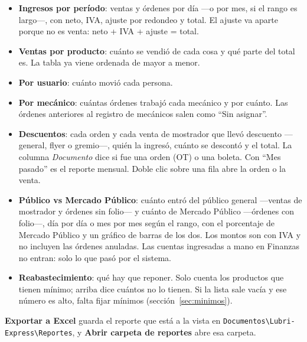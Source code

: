 \documentclass[11pt,a4paper]{article}
\begin{document}
\begin{itemize}
  \item \textbf{Ingresos por período}: ventas y órdenes por día —o por mes, si
        el rango es largo—, con neto, IVA, ajuste por redondeo y total. El
        ajuste va aparte porque no es venta: neto + IVA + ajuste = total.
  \item \textbf{Ventas por producto}: cuánto se vendió de cada cosa y qué
        parte del total es. La tabla ya viene ordenada de mayor a menor.
  \item \textbf{Por usuario}: cuánto movió cada persona.
  \item \textbf{Por mecánico}: cuántas órdenes trabajó cada mecánico y por
        cuánto. Las órdenes anteriores al registro de mecánicos salen como
        ``Sin asignar''.
  \item \textbf{Descuentos}: cada orden y cada venta de mostrador que llevó
        descuento —general, flyer o gremio—, quién la ingresó, cuánto se
        descontó y el total. La columna \emph{Documento} dice si fue una orden
        (OT) o una boleta. Con ``Mes pasado'' es el reporte mensual. Doble clic
        sobre una fila abre la orden o la venta.
  \item \textbf{Público vs Mercado Público}: cuánto entró del público general
        ---ventas de mostrador y órdenes sin folio--- y cuánto de Mercado
        Público ---órdenes con folio---, día por día o mes por mes según el
        rango, con el porcentaje de Mercado Público y un gráfico de barras de
        los dos. Los montos son con IVA y no incluyen las órdenes anuladas. Las
        cuentas ingresadas a mano en Finanzas no entran: solo lo que pasó por
        el sistema.
  \item \textbf{Reabastecimiento}: qué hay que reponer. Solo cuenta los
        productos que tienen mínimo; arriba dice cuántos no lo tienen. Si la
        lista sale vacía y ese número es alto, falta fijar mínimos
        (sección~\ref{sec:minimos}).
\end{itemize}



\textbf{Exportar a Excel} guarda el reporte que está a la vista en
\texttt{Documentos\textbackslash\allowbreak Lubri-Express\textbackslash\allowbreak Reportes}, y
\textbf{Abrir carpeta de reportes} abre esa carpeta.
\end{document}
